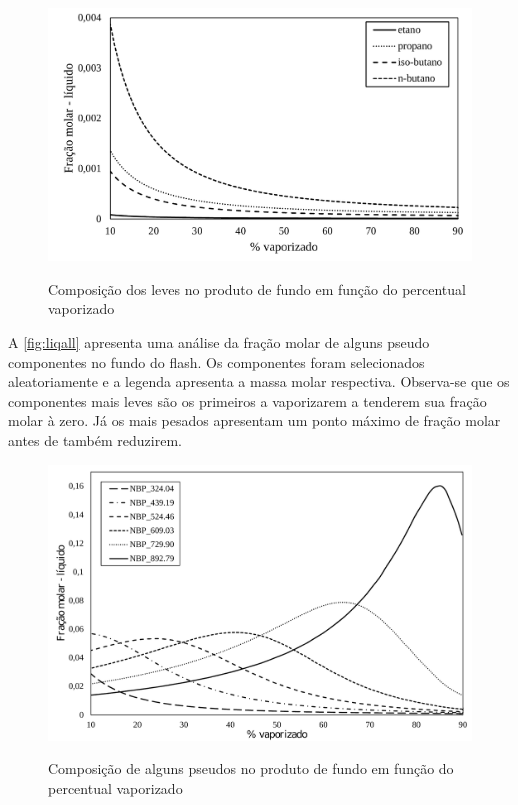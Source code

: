 \begin{figure}[htb]
\centering
{\includegraphics[width=1.0\textwidth]{img/trab3liq.pdf}} 
\caption{Composição dos leves no produto de fundo em função do
percentual vaporizado}
\label{fig:liq}
\end{figure}

A \autoref{fig:liqall} apresenta uma análise da fração molar de alguns pseudo
componentes no fundo do flash. Os componentes foram
selecionados aleatoriamente e a legenda apresenta a massa molar respectiva.
Observa-se que os componentes mais leves são os primeiros a vaporizarem a tenderem sua fração molar à zero. Já os mais pesados apresentam um ponto máximo de fração 
molar antes de também reduzirem.

\begin{figure}[htb] 
\centering
{\includegraphics[width=1.0\textwidth]{img/trab3liqall.pdf}} 
\caption{Composição de alguns pseudos no produto de fundo em função do
percentual vaporizado}
\label{fig:liqall}
\end{figure}


